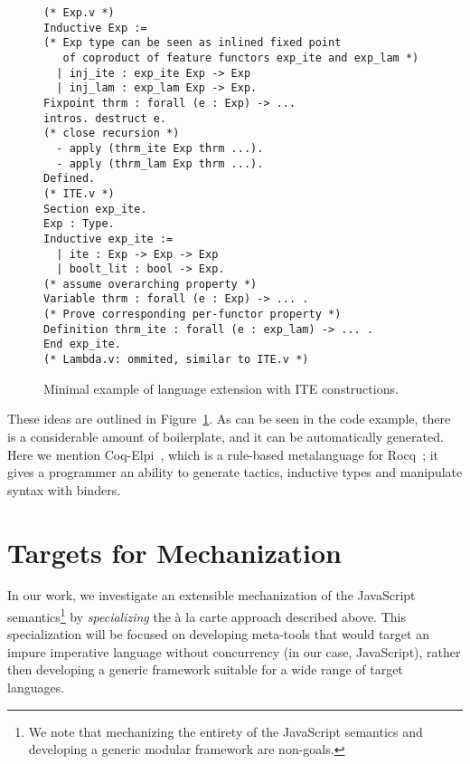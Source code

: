 \documentclass[sigplan,nonacm]{acmart}
\begin{document}
\begin{figure}
\begin{lstlisting}[language=Coq]
(* Exp.v *)
Inductive Exp := 
(* Exp type can be seen as inlined fixed point 
   of coproduct of feature functors exp_ite and exp_lam *)
  | inj_ite : exp_ite Exp -> Exp
  | inj_lam : exp_lam Exp -> Exp.
Fixpoint thrm : forall (e : Exp) -> ...
intros. destruct e.
(* close recursion *)
  - apply (thrm_ite Exp thrm ...).
  - apply (thrm_lam Exp thrm ...).
Defined.
(* ITE.v *)
Section exp_ite.
Exp : Type.
Inductive exp_ite := 
  | ite : Exp -> Exp -> Exp
  | boolt_lit : bool -> Exp.
(* assume overarching property *)
Variable thrm : forall (e : Exp) -> ... .
(* Prove corresponding per-functor property *)
Definition thrm_ite : forall (e : exp_lam) -> ... .
End exp_ite.
(* Lambda.v: ommited, similar to ITE.v *)
\end{lstlisting}
  \caption{Minimal example of language extension with ITE constructions.}
  \label{fig:alacart_example}
\end{figure}

These ideas are outlined in Figure~\ref{fig:alacart_example}.
As can be seen in the code example,
there is a considerable amount of boilerplate,
and it can be automatically generated.
Here we mention Coq-Elpi~\cite{tassi2025elpi}, which is a rule-based metalanguage for Rocq~\cite{the_coq_development_team_2024_14542673};
it gives a programmer an ability to generate tactics,
inductive types and manipulate syntax with binders.

\section{Targets for Mechanization}

In our work,
we investigate an extensible mechanization of the JavaScript semantics\footnote{We note that mechanizing the entirety of the JavaScript semantics
and developing a generic modular framework are non-goals.}
by \emph{specializing} the à la carte approach described above.
This specialization will be focused on developing meta-tools that would target an impure imperative language without concurrency (in our case, JavaScript),
rather then developing a generic framework suitable for a wide range of target languages.
\end{document}
